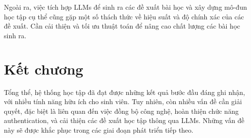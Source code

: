 Ngoài ra, việc tích hợp LLMs để sinh ra các đề xuất bài học và xây dựng mô-đun học tập cụ thể cũng gặp một số thách thức về hiệu suất và độ chính xác của các đề xuất. Cần cải thiện và tối ưu thuật toán để nâng cao chất lượng các bài học sinh ra.

\section{Kết chương}

Tổng thể, hệ thống học tập đã đạt được những kết quả bước đầu đáng ghi nhận, với nhiều tính năng hữu ích cho sinh viên. Tuy nhiên, còn nhiều vấn đề cần giải quyết, đặc biệt là liên quan đến việc đồng bộ công nghệ, hoàn thiện chức năng authentication, và cải thiện các đề xuất học tập thông qua LLMs. Những vấn đề này sẽ được khắc phục trong các giai đoạn phát triển tiếp theo.

